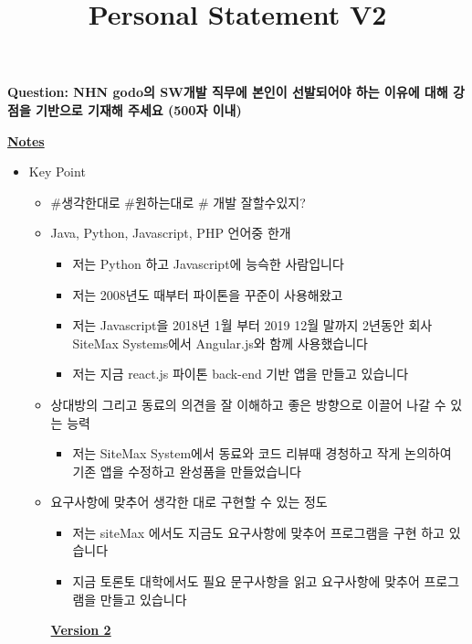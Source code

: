 \documentclass[12pt]{article}
\begin{document}
\title{Personal Statement V2}
\maketitle

\textbf{Question: NHN godo의 SW개발 직무에 본인이 선발되어야 하는 이유에 대해 강점을 기반으로 기재해 주세요 (500자 이내)}

\bigskip


\underline{\textbf{Notes}}

\begin{itemize}
    \item Key Point
    \begin{itemize}
        \item \#생각한대로 \#원하는대로 \# 개발 잘할수있지?
        \item Java, Python, Javascript, PHP 언어중 한개
        \begin{itemize}
            \item 저는 Python 하고 Javascript에 능슥한 사람입니다
            \item 저는 2008년도 때부터 파이톤을 꾸준이 사용해왔고
            \item 저는 Javascript을 2018년 1월 부터 2019 12월 말까지 2년동안 회사 SiteMax Systems에서 Angular.js와 함께 사용했습니다
            \item 저는 지금 react.js 파이톤 back-end 기반 앱을 만들고 있습니다
        \end{itemize}
        \item 상대방의 그리고 동료의 의견을 잘 이해하고 좋은 방향으로 이끌어 나갈 수 있는 능력
        \begin{itemize}
            \item 저는 SiteMax System에서 동료와 코드 리뷰때 경청하고 작게 논의하여 기존 앱을 수정하고 완성품을 만들었습니다
        \end{itemize}
        \item 요구사항에 맞추어 생각한 대로 구현할 수 있는 정도
        \begin{itemize}
            \item 저는 siteMax 에서도 지금도 요구사항에 맞추어 프로그램을 구현 하고 있습니다
            \item 지금 토론토 대학에서도 필요 문구사항을 읽고 요구사항에 맞추어 프로그램을 만들고 있습니다
        \end{itemize}

        \bigskip

        \underline{\textbf{Version 2}}


\end{itemize}
\end{itemize}
\end{document}
